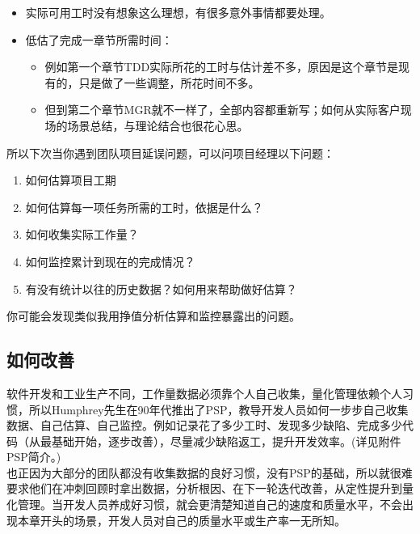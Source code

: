 \begin{itemize}
\tightlist
\item
  实际可用工时没有想象这么理想，有很多意外事情都要处理。
\item
  低估了完成一章节所需时间：

  \begin{itemize}
  \tightlist
  \item
    例如第一个章节TDD实际所花的工时与估计差不多，原因是这个章节是现有的，只是做了一些调整，所花时间不多。
  \item
    但到第二个章节MGR就不一样了，全部内容都重新写；如何从实际客户现场的场景总结，与理论结合也很花心思。
  \end{itemize}
\end{itemize}

所以下次当你遇到团队项目延误问题，可以问项目经理以下问题：

\begin{enumerate}
\tightlist
\item
  如何估算项目工期\\
\item
  如何估算每一项任务所需的工时，依据是什么？\\
\item
  如何收集实际工作量？\\
\item
  如何监控累计到现在的完成情况？\\
\item
  有没有统计以往的历史数据？如何用来帮助做好估算？\\
\end{enumerate}

你可能会发现类似我用挣值分析估算和监控暴露出的问题。

\hypertarget{ux5e94ux8be5ux5982ux4f55ux6539ux5584}{%
\subsection{如何改善}\label{ux5e94ux8be5ux5982ux4f55ux6539ux5584}}

软件开发和工业生产不同，工作量数据必须靠个人自己收集，量化管理依赖个人习惯，所以Humphrey先生在90年代推出了PSP，教导开发人员如何一步步自己收集数据、自己估算、自己监控。例如记录花了多少工时、发现多少缺陷、完成多少代码（从最基础开始，逐步改善），尽量减少缺陷返工，提升开发效率。(详见附件PSP简介。)\\

也正因为大部分的团队都没有收集数据的良好习惯，没有PSP的基础，所以就很难要求他们在冲刺回顾时拿出数据，分析根因、在下一轮迭代改善，从定性提升到量化管理。当开发人员养成好习惯，就会更清楚知道自己的速度和质量水平，不会出现本章开头的场景，开发人员对自己的质量水平或生产率一无所知。

